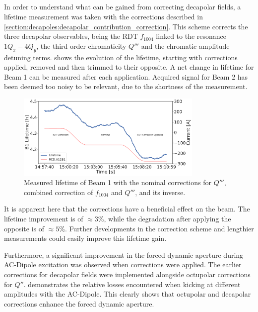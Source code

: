 \subsection{}

In order to understand what can be gained from correcting decapolar fields, a lifetime measurement
was taken with the corrections described in 
\cref{section:decapoles:decapolar_contribution_correction}. This scheme corrects the three decapolar 
observables, being the RDT $f_{1004}$ linked to the resonance $1Q_x - 4Q_y$, the third order
chromaticity $Q'''$ and the chromatic amplitude detuning terms.
 shows the evolution of the lifetime, starting with
corrections applied, removed and then trimmed to their opposite. A net change in lifetime for Beam 1
can be measured after each application. Acquired signal for Beam 2 has been deemed too noisy to be 
relevant, due to the shortness of the measurement.

\begin{figure}[!htb]
    \centering
    \includegraphics[width=0.8\textwidth]{./images/b5_lifetime_rdt_corr.pdf}
    \caption{Measured lifetime of Beam 1 with the nominal corrections for $Q'''$, combined
    correction of $f_{1004}$ and $Q'''$, and its inverse.}
    \label{fig:decapoles:impact:b5_lifetime_rdt_corr}
\end{figure}

It is apparent here that the corrections have a beneficial effect on the beam. The lifetime
improvement is of $\approx 3 \%$, while the degradation after applying the opposite is of $\approx
5\%$. Further developments in the correction scheme and lengthier measurements could easily improve
this lifetime gain.


Furthermore, a significant improvement in the forced dynamic aperture during AC-Dipole excitation
was observed when corrections were applied. The earlier corrections for decapolar fields were
implemented alongside octupolar corrections for $Q''$. 
demonstrates the relative losses encountered when kicking at different amplitudes with the
AC-Dipole. This clearly shows that octupolar and decapolar corrections enhance the forced dynamic
aperture.

